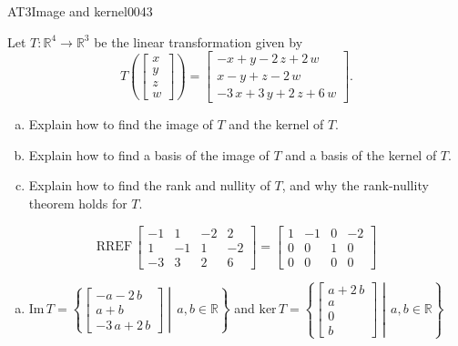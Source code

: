 \newpage




\begin{exercise}{AT3}{Image and kernel}{0043} 
\begin{exerciseStatement} 

 Let \(T:\mathbb{R}^4 \to \mathbb{R}^3\) be the linear transformation given by \[T\left( \left[\begin{array}{c}
x \\
y \\
z \\
{w}
\end{array}\right] \right) = \left[\begin{array}{c}
-x + y - 2 \, z + 2 \, {w} \\
x - y + z - 2 \, {w} \\
-3 \, x + 3 \, y + 2 \, z + 6 \, {w}
\end{array}\right].\] 

 

\begin{enumerate}[(a)]
\item Explain how to find the image of \(T\) and the kernel of \(T\).
\item Explain how to find a basis of the image of \(T\) and a basis of the kernel of \(T\).
\item Explain how to find the rank and nullity of \(T\), and why the rank-nullity theorem holds for \(T\).
\end{enumerate}

     \end{exerciseStatement}
 \begin{exerciseAnswer} 

\[\mathrm{RREF}\,\left[\begin{array}{cccc}
-1 & 1 & -2 & 2 \\
1 & -1 & 1 & -2 \\
-3 & 3 & 2 & 6
\end{array}\right]=\left[\begin{array}{cccc}
1 & -1 & 0 & -2 \\
0 & 0 & 1 & 0 \\
0 & 0 & 0 & 0
\end{array}\right]\]

 

\begin{enumerate}[(a)]
\item  

 \(\mathrm{Im}\,T =  \left\{ \left[\begin{array}{c}
-a - 2 \, b \\
a + b \\
-3 \, a + 2 \, b
\end{array}\right] \middle|\,a,b\in\mathbb{R}\right\}\) and \(\mathrm{ker}\,T = \left\{ \left[\begin{array}{c}
a + 2 \, b \\
a \\
0 \\
b
\end{array}\right] \middle|\,a,b\in\mathbb{R}\right\}\) 


\end{enumerate}
\end{exerciseAnswer}
\end{exercise}
